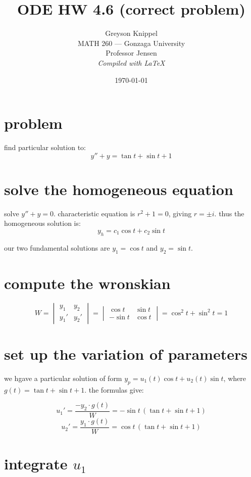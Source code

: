 \documentclass[12pt]{article}
\title{ODE HW 4.6 (correct problem)}
\author{
Greyson Knippel \\[4pt]
MATH 260 --- Gonzaga University \\[4pt]
Professor Jensen \\[4pt]
\textit{Compiled with \LaTeX}
}
\date{\today}
\begin{document}
\maketitle

\section*{problem}

find particular solution to:
\[
    y'' + y = \tan t + \sin t + 1
\]

\section*{solve the homogeneous equation}

solve $y'' + y = 0$. characteristic equation is $r^2 + 1 = 0$, giving $r = \pm i$. thus the homogeneous solution is:
\[
    y_h = c_1 \cos t + c_2 \sin t
\]

our two fundamental solutions are $y_1 = \cos t$ and $y_2 = \sin t$.

\section*{compute the wronskian}

\[
    W = \begin{vmatrix} y_1 & y_2 \\ y_1' & y_2' \end{vmatrix}
      = \begin{vmatrix} \cos t & \sin t \\ -\sin t & \cos t \end{vmatrix}
      = \cos^2 t + \sin^2 t = 1
\]

\section*{set up the variation of parameters}

we hgave a particular solution of form $y_p = u_1(t)\cos t + u_2(t)\sin t$, where $g(t) = \tan t + \sin t + 1$. the formulas give:

\[
    u_1' = \frac{-y_2 \cdot g(t)}{W} = -\sin t\,(\tan t + \sin t + 1)
\]
\[
    u_2' = \frac{y_1 \cdot g(t)}{W} = \cos t\,(\tan t + \sin t + 1)
\]

\section*{integrate $u_1$}
\end{document}

